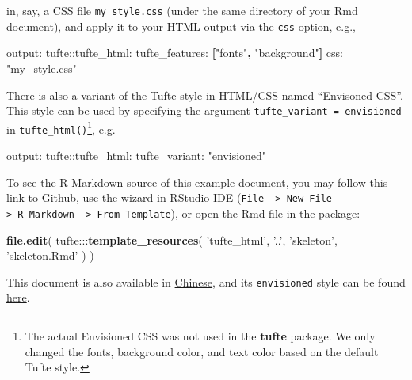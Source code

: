 \documentclass[]{tufte-book}
\newenvironment{Shaded}{}{}
\newcommand{\AttributeTok}[1]{\textcolor[rgb]{0.49,0.56,0.16}{#1}}
\newcommand{\FunctionTok}[1]{\textcolor[rgb]{0.02,0.16,0.49}{#1}}
\newcommand{\KeywordTok}[1]{\textcolor[rgb]{0.00,0.44,0.13}{\textbf{#1}}}
\newcommand{\NormalTok}[1]{#1}
\newcommand{\OperatorTok}[1]{\textcolor[rgb]{0.40,0.40,0.40}{#1}}
\newcommand{\StringTok}[1]{\textcolor[rgb]{0.25,0.44,0.63}{#1}}
\begin{document}
in, say, a CSS file \texttt{my\_style.css} (under the same directory of
your Rmd document), and apply it to your HTML output via the
\texttt{css} option, e.g.,

\begin{Shaded}
\begin{Highlighting}[]
\FunctionTok{output:}
  \FunctionTok{tufte:}\AttributeTok{:tufte_html:}
    \FunctionTok{tufte_features:}\AttributeTok{ }\KeywordTok{[}\StringTok{"fonts"}\KeywordTok{,} \StringTok{"background"}\KeywordTok{]}
    \FunctionTok{css:}\AttributeTok{ }\StringTok{"my_style.css"}
\end{Highlighting}
\end{Shaded}

There is also a variant of the Tufte style in HTML/CSS named
``\href{http://nogginfuel.com/envisioned-css/}{Envisoned CSS}''. This
style can be used by specifying the argument
\texttt{tufte\_variant\ =\ \textquotesingle{}envisioned\textquotesingle{}}
in \texttt{tufte\_html()}\footnote{The actual Envisioned CSS was not
  used in the \textbf{tufte} package. We only changed the fonts,
  background color, and text color based on the default Tufte style.},
e.g.

\begin{Shaded}
\begin{Highlighting}[]
\FunctionTok{output:}
  \FunctionTok{tufte:}\AttributeTok{:tufte_html:}
    \FunctionTok{tufte_variant:}\AttributeTok{ }\StringTok{"envisioned"}
\end{Highlighting}
\end{Shaded}

To see the R Markdown source of this example document, you may follow
\href{https://github.com/rstudio/tufte/raw/master/inst/rmarkdown/templates/tufte_html/skeleton/skeleton.Rmd}{this
link to Github}, use the wizard in RStudio IDE
(\texttt{File\ -\textgreater{}\ New\ File\ -\textgreater{}\ R\ Markdown\ -\textgreater{}\ From\ Template}),
or open the Rmd file in the package:

\begin{Shaded}
\begin{Highlighting}[]
\KeywordTok{file.edit}\NormalTok{(}
\NormalTok{  tufte}\OperatorTok{:::}\KeywordTok{template_resources}\NormalTok{(}
    \StringTok{'tufte_html'}\NormalTok{, }\StringTok{'..'}\NormalTok{, }\StringTok{'skeleton'}\NormalTok{, }\StringTok{'skeleton.Rmd'}
\NormalTok{  )}
\NormalTok{)}
\end{Highlighting}
\end{Shaded}

This document is also available in
\href{http://rstudio.github.io/tufte/cn/}{Chinese}, and its
\texttt{envisioned} style can be found
\href{http://rstudio.github.io/tufte/envisioned/}{here}.


\end{document}
